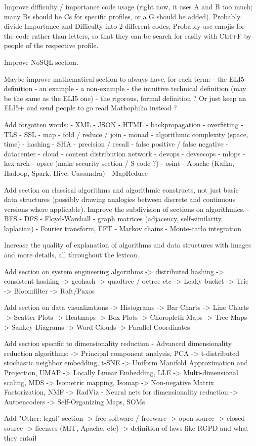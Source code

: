 \documentclass{article}
\begin{document}
Improve difficulty / importance code usage (right now, it uses A and B too much; many Bs should be Cs for specific profiles, or a G should be added). Probably divide Importance and Difficulty into 2 different codes. Probably use emojis for the code rather than letters, so that they can be search for easily with Ctrl+F by people of the respective profile.

Improve NoSQL section.

Maybe improve mathematical section to always have, for each term:
- the ELI5 definition
- an example
- a non-example
- the intuitive technical definition (may be the same as the ELI5 one)
- the rigorous, formal definition
? Or just keep an ELI5+ and send people to go read Mathophilia instead ?

Add forgotten words:
- XML
- JSON
- HTML
- backpropagation
- overfitting
- TLS
- SSL
- map
- fold / reduce / join
- monad
- algorithmic complexity (space, time)
- hashing
- SHA
- precision / recall
- false positive / false negative
- datacenter
- cloud
- content distribution network
- devops
- devsecops
- mlops
- hex arch
- opsec (make security section / S code ?) 
- osint
- Apache (Kafka, Hadoop, Spark, Hive, Cassandra)
- MapReduce



Add section on classical algorithms and algorithmic constructs, not just basic data structures (possibly drawing analogies between discrete and continuous versions where applicable). Improve the subdivision of sections on algorithmics.
- BFS
- DFS
- Floyd-Warshall
- graph matrices (adjacency, self-similarity, laplacian)
- Fourier transform, FFT
- Markov chains
- Monte-carlo integration

Increase the quality of explanation of algorithms and data structures with images and more details, all throughout the lexicon.

Add section on system engineering algorithms
-> distributed hashing
-> consistent hashing
-> geohash
-> quadtree / octree etc
-> Leaky bucket
-> Trie
-> Bloomfilter
-> Raft/Paxos

Add section on data visualizations
-> Histograms
-> Bar Charts
-> Line Charts
-> Scatter Plots
-> Heatmaps
-> Box Plots
-> Choropleth Maps
-> Tree Maps
-> Sankey Diagrams
-> Word Clouds
-> Parallel Coordinates

Add section specific to dimensionality reduction
- Advanced dimensionality reduction algorithms:
-> Principal component analysis, PCA
-> t-distributed stochastic neighbor embedding, t-SNE 
-> Uniform Manifold Approximation and Projection, UMAP
-> Locally Linear Embedding, LLE
-> Multi-dimensional scaling, MDS
-> Isometric mapping, Isomap
-> Non-negative Matrix Factorization, NMF
-> RadViz
- Neural nets for dimensionality reduction
-> Autoencoders
-> Self-Organizing Maps, SOMs

Add "Other: legal" section
-> free software / freeware
-> open source
-> closed source
-> licenses (MIT, Apache, etc)
-> definition of laws like RGPD and what they entail
\end{document}
